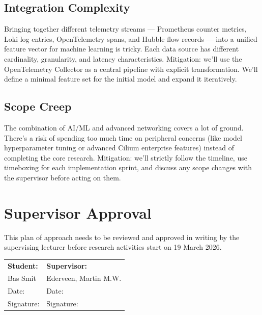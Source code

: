 \subsection{Integration Complexity}

Bringing together different telemetry streams — Prometheus counter metrics, Loki log entries, OpenTelemetry spans, and Hubble flow records — into a unified feature vector for machine learning is tricky. Each data source has different cardinality, granularity, and latency characteristics. Mitigation: we'll use the OpenTelemetry Collector as a central pipeline with explicit transformation. We'll define a minimal feature set for the initial model and expand it iteratively.

\subsection{Scope Creep}

The combination of AI/ML and advanced networking covers a lot of ground. There's a risk of spending too much time on peripheral concerns (like model hyperparameter tuning or advanced Cilium enterprise features) instead of completing the core research. Mitigation: we'll strictly follow the timeline, use timeboxing for each implementation sprint, and discuss any scope changes with the supervisor before acting on them.

\section{Supervisor Approval}

This plan of approach needs to be reviewed and approved in writing by the supervising lecturer before research activities start on 19 March 2026.

\vspace{1cm}
\begin{tabular}{@{}p{6cm}p{6cm}@{}}
\textbf{Student:} & \textbf{Supervisor:} \\[2cm]
Bas Smit & Ederveen, Martin M.W. \\
Date: \underline{\hspace{3cm}} & Date: \underline{\hspace{3cm}} \\[0.5cm]
Signature: \underline{\hspace{3cm}} & Signature: \underline{\hspace{3cm}} \\
\end{tabular}
